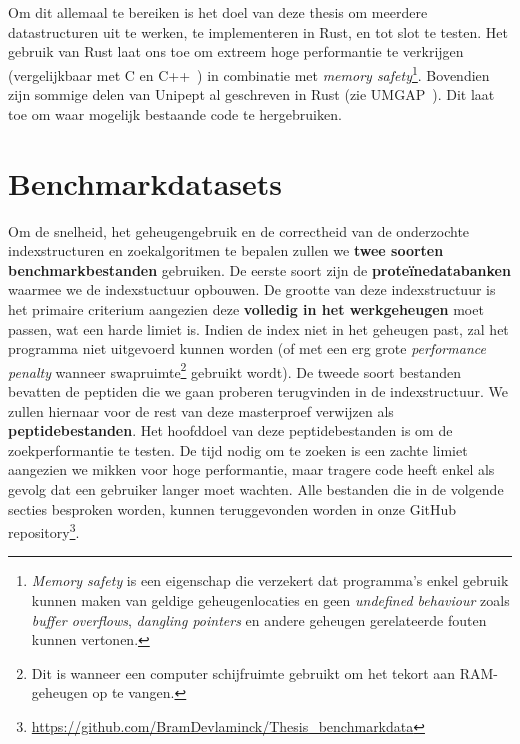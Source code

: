 \\ \\
Om dit allemaal te bereiken is het doel van deze thesis om meerdere datastructuren uit te werken, te implementeren in Rust, en tot slot te testen.
Het gebruik van Rust laat ons toe om extreem hoge performantie te verkrijgen (vergelijkbaar met C en C++~\cite{rustPerformantie}) in combinatie met \textit{memory safety}\footnote{\textit{Memory safety} is een eigenschap die verzekert dat programma's enkel gebruik kunnen maken van geldige geheugenlocaties en geen \textit{undefined behaviour} zoals \textit{buffer overflows}, \textit{dangling pointers} en andere geheugen gerelateerde fouten kunnen vertonen.}.
Bovendien zijn sommige delen van Unipept al geschreven in Rust (zie UMGAP~\cite{UMGAP_paper, UMGAP_source}).
Dit laat toe om waar mogelijk bestaande code te hergebruiken.


\section{Benchmarkdatasets}\label{sec:datasets}
Om de snelheid, het geheugengebruik en de correctheid van de onderzochte indexstructuren en zoekalgoritmen te bepalen zullen we \textbf{twee soorten benchmarkbestanden} gebruiken.
De eerste soort zijn de \textbf{proteïnedatabanken} waarmee we de indexstuctuur opbouwen.
De grootte van deze indexstructuur is het primaire criterium aangezien deze \textbf{volledig in het werkgeheugen} moet passen, wat een harde limiet is.
Indien de index niet in het geheugen past, zal het programma niet uitgevoerd kunnen worden (of met een erg grote \textit{performance penalty} wanneer swapruimte\footnote{Dit is wanneer een computer schijfruimte gebruikt om het tekort aan RAM-geheugen op te vangen.} gebruikt wordt).
De tweede soort bestanden bevatten de peptiden die we gaan proberen terugvinden in de indexstructuur.
We zullen hiernaar voor de rest van deze masterproef verwijzen als \textbf{peptidebestanden}.
Het hoofddoel van deze peptidebestanden is om de zoekperformantie te testen.
De tijd nodig om te zoeken is een zachte limiet aangezien we mikken voor hoge performantie, maar tragere code heeft enkel als gevolg dat een gebruiker langer moet wachten.
Alle bestanden die in de volgende secties besproken worden, kunnen teruggevonden worden in onze GitHub repository\footnote{\url{https://github.com/BramDevlaminck/Thesis_benchmarkdata}}.


